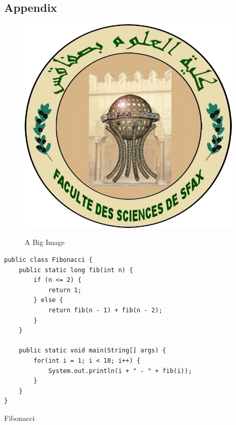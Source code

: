 \begin{appendices}
\section{Appendix}
\pagebreak

\begin{figure}[H]
    \centering
    \caption{A Big Image}
    \includegraphics[width=0.95\textwidth]{fss-old}
    \label{fig:appendixImage}
\end{figure}

\begin{listing}[ht]
    \begin{verbatim}
public class Fibonacci {
	public static long fib(int n) {
		if (n <= 2) {
			return 1;
		} else {
			return fib(n - 1) + fib(n - 2);
		}
	}

	public static void main(String[] args) {
		for(int i = 1; i < 10; i++) {
			System.out.println(i + " - " + fib(i));
		}
	}
}
    \end{verbatim}
    \caption{Fibonacci}
    \label{lst:fibAppendix}
\end{listing}

\end{appendices}
